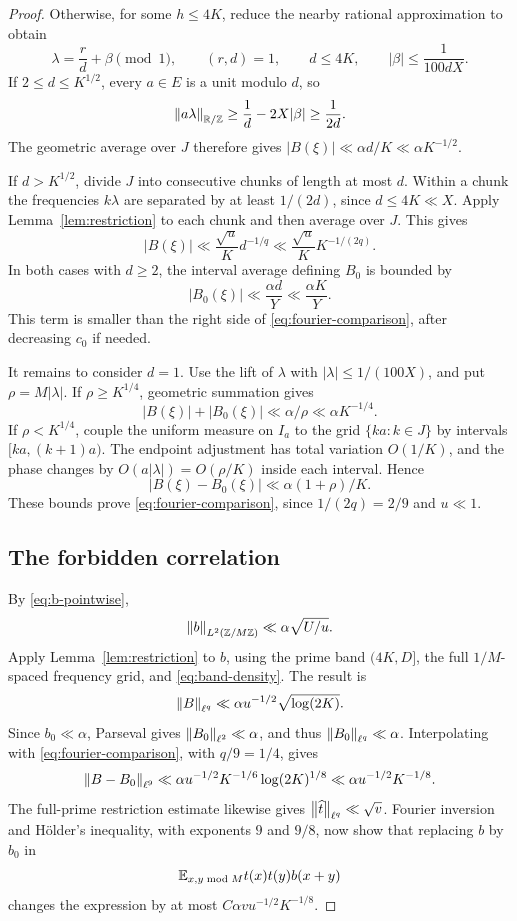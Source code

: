 \begin{proof}
Otherwise, for some \(h\le4K\), reduce the nearby rational
approximation to obtain
\[
 \lambda=\frac rd+\beta\pmod1,\qquad
 (r,d)=1,\qquad d\le4K,\qquad
 |\beta|\le\frac1{100dX}.
\]
If \(2\le d\le K^{1/2}\), every \(a\in E\) is a unit modulo
\(d\), so
\[
 \left\lVert a\lambda\right\rVert_{\mathbb R/\mathbb Z}
     \ge\frac1d-2X|\beta|\ge\frac1{2d}.
\]
The geometric average over \(J\) therefore gives
\(|B(\xi)|\ll\alpha d/K\ll\alpha K^{-1/2}\).

If \(d>K^{1/2}\), divide \(J\) into consecutive chunks of
length at most \(d\). Within a chunk the frequencies \(k\lambda\)
are separated by at least \(1/(2d)\), since \(d\le4K\ll X\).
Apply Lemma~\ref{lem:restriction} to each chunk and then
average over \(J\). This gives
\[
 |B(\xi)|\ll\frac{\sqrt u}{K}d^{-1/q}
            \ll\frac{\sqrt u}{K}K^{-1/(2q)}.
\]
In both cases with \(d\ge2\), the interval average defining
\(B_0\) is bounded by
\[
 |B_0(\xi)|\ll\frac{\alpha d}{Y}
                 \ll\frac{\alpha K}{Y}.
\]
This term is smaller than the right side of
\eqref{eq:fourier-comparison}, after decreasing \(c_0\) if needed.

It remains to consider \(d=1\). Use the lift of \(\lambda\)
with \(|\lambda|\le1/(100X)\), and put
\(\rho=M|\lambda|\). If \(\rho\ge K^{1/4}\), geometric
summation gives
\[
 |B(\xi)|+|B_0(\xi)|\ll\alpha/\rho
                           \ll\alpha K^{-1/4}.
\]
If \(\rho<K^{1/4}\), couple the uniform measure on \(I_a\)
to the grid \(\{ka:k\in J\}\) by intervals
\([ka,(k+1)a)\). The endpoint adjustment has total variation
\(O(1/K)\), and the phase changes by
\(O(a|\lambda|)=O(\rho/K)\) inside each interval. Hence
\[
 |B(\xi)-B_0(\xi)|\ll\alpha(1+\rho)/K.
\]
These bounds prove \eqref{eq:fourier-comparison}, since
\(1/(2q)=2/9\) and \(u\ll1\).

\subsection*{The forbidden correlation}
By \eqref{eq:b-pointwise},
\[
 \left\lVert b\right\rVert_{L^2(\mathbb Z/M\mathbb Z)}
       \ll\alpha\sqrt{U/u}.
\]
Apply Lemma~\ref{lem:restriction} to \(b\), using the
prime band \((4K,D]\), the full \(1/M\)-spaced frequency
grid, and \eqref{eq:band-density}. The result is
\[
 \left\lVert B\right\rVert_{\ell^q}\ll\alpha u^{-1/2}\sqrt{\log(2K)}.
\]
Since \(b_0\ll\alpha\), Parseval gives
\(\left\lVert B_0\right\rVert_{\ell^2}\ll\alpha\), and thus
\(\left\lVert B_0\right\rVert_{\ell^q}\ll\alpha\).
Interpolating with \eqref{eq:fourier-comparison}, with
\(q/9=1/4\), gives
\begin{equation}\label{eq:fourier-nine}
 \left\lVert B-B_0\right\rVert_{\ell^9}
 \ll\alpha u^{-1/2}K^{-1/6}\log(2K)^{1/8}
 \ll\alpha u^{-1/2}K^{-1/8}.
\end{equation}
The full-prime restriction estimate likewise gives
\(\left\lVert \widehat t\right\rVert_{\ell^q}\ll\sqrt v\).
Fourier inversion and H\"older's inequality, with exponents
\(9\) and \(9/8\), now show that replacing \(b\) by \(b_0\) in
\[
 \mathbb E_{x,y\bmod M}t(x)t(y)b(x+y)
\]
changes the expression by at most
\(C\alpha v u^{-1/2}K^{-1/8}\).


\end{proof}

